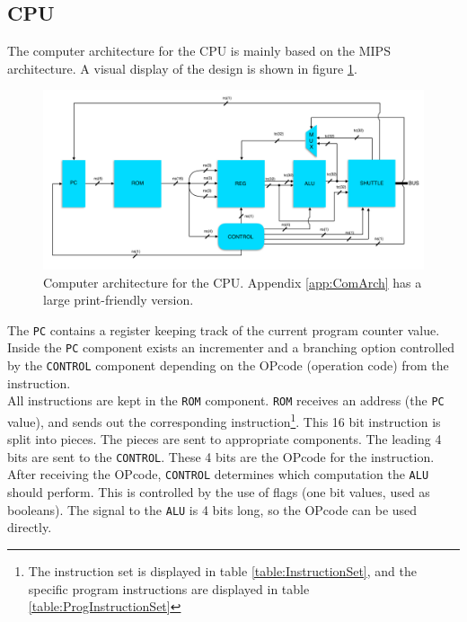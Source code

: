 \subsection{CPU}
\label{sec:cpu}

The computer architecture for the CPU is mainly based on the MIPS architecture. A visual display of the design is shown in figure \ref{fig:ComArch}.

\begin{figure}[H]
    \centering
    \includegraphics[width=\textwidth]{2Implementation/fig/ComputerArchitecture.pdf}
    \caption{Computer architecture for the CPU. Appendix \ref{app:ComArch} has a large print-friendly version.}
    \label{fig:ComArch}
\end{figure}

The \texttt{PC} contains a register keeping track of the current program counter value. Inside the \texttt{PC} component exists an incrementer and a branching option controlled by the \texttt{CONTROL} component depending on the OPcode (operation code) from the instruction. \\

All instructions are kept in the \texttt{ROM} component. \texttt{ROM} receives an address (the \texttt{PC} value), and sends out the corresponding instruction\footnote{The instruction set is displayed in table \ref{table:InstructionSet}, and the specific program instructions are displayed in table \ref{table:ProgInstructionSet}}. This 16 bit instruction is split into pieces. The pieces are sent to appropriate components. The leading 4 bits are sent to the \texttt{CONTROL}. These 4 bits are the OPcode for the instruction. \\

After receiving the OPcode, \texttt{CONTROL} determines which computation the \texttt{ALU} should perform. This is controlled by the use of flags (one bit values, used as booleans). The signal to the \texttt{ALU} is 4 bits long, so the OPcode can be used directly. \\

